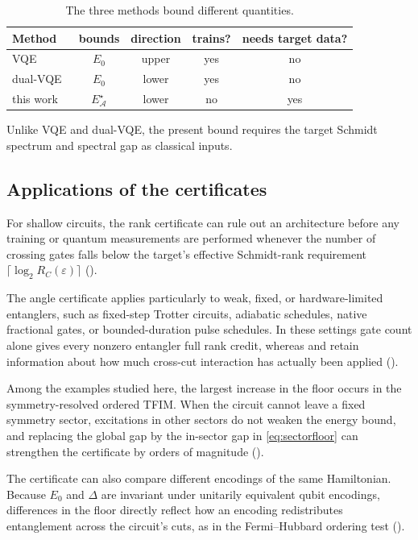 \documentclass[reprint,aps,pra,floatfix,superscriptaddress,nofootinbib,longbibliography]{revtex4-2}
\theoremstyle{remark}
\theoremstyle{definition}
\newcommand{\calA}{\mathcal{A}}
\newcommand{\Estar}{E_{\calA}^{\star}}
\begin{document}
\begin{table}[t]
\centering
\caption{The three methods bound different quantities.}
\label{tab:positioning}
{\footnotesize\setlength{\tabcolsep}{3.6pt}
\begin{tabular}{lcccc}
\toprule
Method & bounds & direction & trains? & needs target data?\\
\midrule
VQE                                & $E_0$    & upper & yes & no\\
dual-VQE~\cite{westerheim2024dual} & $E_0$    & lower & yes & no\\
this work                          & $\Estar$ & lower & no  & yes\\
\bottomrule
\end{tabular}}
\end{table}

Unlike VQE and dual-VQE, the present bound requires the target Schmidt spectrum
and spectral gap as classical inputs.

\subsection{Applications of the certificates}

For shallow circuits, the rank certificate can rule out an architecture before
any training or quantum measurements are performed whenever the number of
crossing gates falls below the target's effective Schmidt-rank requirement
$\lceil\log_2 R_C(\varepsilon)\rceil$ ().

The angle certificate applies particularly to weak, fixed, or hardware-limited
entanglers, such as fixed-step Trotter circuits, adiabatic schedules, native
fractional gates, or bounded-duration pulse schedules. In these settings gate
count alone gives every nonzero entangler full rank credit, whereas
 and  retain information about how much cross-cut
interaction has actually been applied ().

Among the examples studied here, the largest increase in the floor occurs in the
symmetry-resolved ordered TFIM. When the circuit
cannot leave a fixed symmetry sector, excitations in other sectors do not weaken
the energy bound, and replacing the global gap by the in-sector gap in
\eqref{eq:sectorfloor} can strengthen the certificate by orders of magnitude
().

The certificate can also compare different encodings of the same Hamiltonian.
Because $E_0$ and $\Delta$ are invariant under unitarily equivalent qubit
encodings, differences in the floor directly reflect how an encoding
redistributes entanglement across the circuit's cuts, as in the Fermi--Hubbard
ordering test ().
\end{document}
